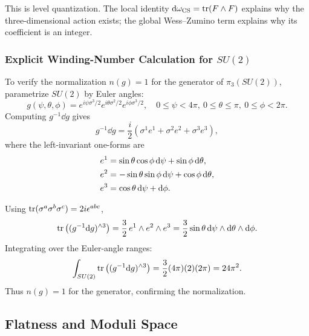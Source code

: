 This is level quantization. The local identity $\mathrm{d}\omega_{\operatorname{CS}}=\operatorname{tr}(F\wedge F)$ explains why the three-dimensional action exists; the global Wess--Zumino term explains why its coefficient is an integer.

\subsubsection{\texorpdfstring{Explicit Winding-Number Calculation for $SU(2)$}{Explicit Winding-Number Calculation for SU(2)}}

To verify the normalization $n(g)=1$ for the generator of $\pi_3(SU(2))$, parametrize $SU(2)$ by Euler angles:
\begin{equation}
  g(\psi,\theta,\phi)
  =
  e^{i\psi\sigma^3/2}
  e^{i\theta\sigma^2/2}
  e^{i\phi\sigma^3/2},
  \quad
  0\leq\psi<4\pi,\
  0\leq\theta\leq\pi,\
  0\leq\phi<2\pi.
  \label{eq:forms-euler-param}
\end{equation}
Computing $g^{-1}\dd g$ gives
\begin{equation}
  g^{-1}\dd g
  =
  \frac{i}{2}\left(\sigma^1 e^1+\sigma^2 e^2+\sigma^3 e^3\right),
  \label{eq:forms-ginv-dg-euler}
\end{equation}
where the left-invariant one-forms are
\begin{align}
  e^1&=\sin\theta\cos\phi\,\mathrm{d}\psi+\sin\phi\,\mathrm{d}\theta,
  \notag\\
  e^2&=-\sin\theta\sin\phi\,\mathrm{d}\psi+\cos\phi\,\mathrm{d}\theta,
  \notag\\
  e^3&=\cos\theta\,\mathrm{d}\psi+\mathrm{d}\phi.
  \label{eq:forms-left-invariant}
\end{align}

Using $\operatorname{tr}(\sigma^a\sigma^b\sigma^c)=2i\epsilon^{abc}$,
\begin{equation}
  \operatorname{tr}\left((g^{-1}\mathrm{d} g)^{\wedge 3}\right)
  =
  \frac32\,e^1\wedge e^2\wedge e^3
  =
  \frac32\sin\theta\,\mathrm{d}\psi\wedge\mathrm{d}\theta\wedge\mathrm{d}\phi.
  \label{eq:forms-wz-euler}
\end{equation}
Integrating over the Euler-angle ranges:
\begin{equation}
  \int_{SU(2)}
  \operatorname{tr}\left((g^{-1}\mathrm{d} g)^{\wedge 3}\right)
  =
  \frac32(4\pi)(2)(2\pi)
  =
  24\pi^2.
  \label{eq:forms-euler-integral}
\end{equation}
Thus $n(g)=1$ for the generator, confirming the normalization.

\subsection{Flatness and Moduli Space}
\label{subsec:flat-connection-eom}

